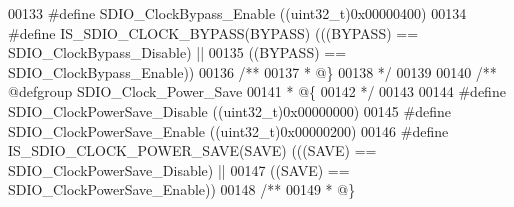 \begin{DoxyCode}
00133 \textcolor{preprocessor}{#}\textcolor{preprocessor}{define} \textcolor{preprocessor}{SDIO\_ClockBypass\_Enable}              \textcolor{preprocessor}{(}\textcolor{preprocessor}{(}\textcolor{preprocessor}{uint32\_t}\textcolor{preprocessor}{)}0x00000400\textcolor{preprocessor}{)}
00134 \textcolor{preprocessor}{#}\textcolor{preprocessor}{define} \textcolor{preprocessor}{IS\_SDIO\_CLOCK\_BYPASS}\textcolor{preprocessor}{(}\textcolor{preprocessor}{BYPASS}\textcolor{preprocessor}{)} \textcolor{preprocessor}{(}\textcolor{preprocessor}{(}\textcolor{preprocessor}{(}\textcolor{preprocessor}{BYPASS}\textcolor{preprocessor}{)} \textcolor{preprocessor}{==} SDIO_ClockBypass_Disable\textcolor{preprocessor}{)} \textcolor{preprocessor}{||}
00135                                      \textcolor{preprocessor}{(}\textcolor{preprocessor}{(}\textcolor{preprocessor}{BYPASS}\textcolor{preprocessor}{)} \textcolor{preprocessor}{==} SDIO_ClockBypass_Enable\textcolor{preprocessor}{)}\textcolor{preprocessor}{)}
00136 \textcolor{comment}{/**}
00137 \textcolor{comment}{  * @\}}
00138 \textcolor{comment}{  */}
00139 
00140 \textcolor{comment}{/** @defgroup SDIO\_Clock\_Power\_Save }
00141 \textcolor{comment}{  * @\{}
00142 \textcolor{comment}{  */}
00143 
00144 \textcolor{preprocessor}{#}\textcolor{preprocessor}{define} \textcolor{preprocessor}{SDIO\_ClockPowerSave\_Disable}         \textcolor{preprocessor}{(}\textcolor{preprocessor}{(}\textcolor{preprocessor}{uint32\_t}\textcolor{preprocessor}{)}0x00000000\textcolor{preprocessor}{)}
00145 \textcolor{preprocessor}{#}\textcolor{preprocessor}{define} \textcolor{preprocessor}{SDIO\_ClockPowerSave\_Enable}          \textcolor{preprocessor}{(}\textcolor{preprocessor}{(}\textcolor{preprocessor}{uint32\_t}\textcolor{preprocessor}{)}0x00000200\textcolor{preprocessor}{)}
00146 \textcolor{preprocessor}{#}\textcolor{preprocessor}{define} \textcolor{preprocessor}{IS\_SDIO\_CLOCK\_POWER\_SAVE}\textcolor{preprocessor}{(}\textcolor{preprocessor}{SAVE}\textcolor{preprocessor}{)} \textcolor{preprocessor}{(}\textcolor{preprocessor}{(}\textcolor{preprocessor}{(}\textcolor{preprocessor}{SAVE}\textcolor{preprocessor}{)} \textcolor{preprocessor}{==} 
      SDIO_ClockPowerSave_Disable\textcolor{preprocessor}{)} \textcolor{preprocessor}{||}
00147                                         \textcolor{preprocessor}{(}\textcolor{preprocessor}{(}\textcolor{preprocessor}{SAVE}\textcolor{preprocessor}{)} \textcolor{preprocessor}{==} 
      SDIO_ClockPowerSave_Enable\textcolor{preprocessor}{)}\textcolor{preprocessor}{)}
00148 \textcolor{comment}{/**}
00149 \textcolor{comment}{  * @\}}

\end{DoxyCode}
